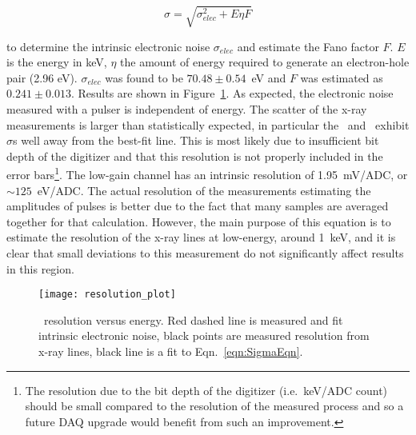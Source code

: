 			\begin{equation}
				\sigma = \sqrt{\sigma_{elec}^{2} + E \eta F}
				\label{eqn:SigmaEqn}
			\end{equation}

to determine the intrinsic electronic noise $\sigma_{elec}$ and estimate the Fano factor $F$.  $E$ is the energy in keV, $\eta$ the amount of energy required to generate an electron-hole pair (2.96 eV).  $\sigma_{elec}$ was found to be $70.48\pm0.54$~eV and $F$ was estimated as $0.241\pm0.013$.  Results are shown in Figure~\ref{fig:BeGeResPlot}.  As expected, the electronic noise measured with a pulser is independent of energy.  The scatter of the x-ray measurements is larger than statistically expected, in particular the \znsixfive~and \galsixeight~exhibit $\sigma$s well away from the best-fit line.  This is most likely due to insufficient bit depth of the digitizer and that this resolution is not properly included in the error bars\footnote{The resolution due to the bit depth of the digitizer (i.e.~keV/ADC count) should be small compared to the resolution of the measured process and so a future DAQ upgrade would benefit from such an improvement.}.  The low-gain channel has an intrinsic resolution of 1.95~mV/ADC, or $\sim125$~eV/ADC.  The actual resolution of the measurements estimating the amplitudes of pulses is better due to the fact that many samples are averaged together for that calculation.  However, the main purpose of this equation is to estimate the resolution of the x-ray lines at low-energy, around 1~keV, and it is clear that small deviations to this measurement do not significantly affect results in this region.

			\begin{figure}
				\centering
				\texttt{[image: resolution\_plot]}
				\caption[\bege~resolution versus energy]
				{\bege~resolution versus energy.  Red dashed line is measured and fit intrinsic electronic noise, 
				black points are measured resolution from x-ray lines, black line is a fit to Eqn.~\ref{eqn:SigmaEqn}.}
				\label{fig:BeGeResPlot}
			\end{figure}





